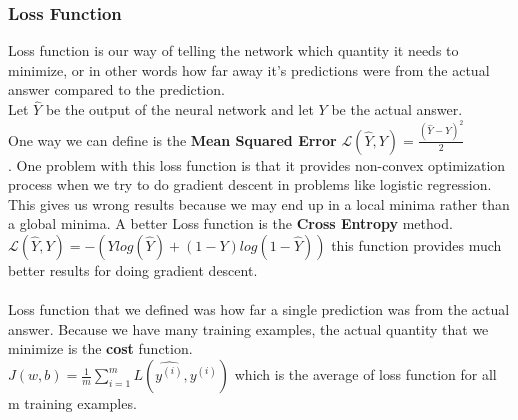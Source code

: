 \documentclass[12pt]{article}
\begin{document}
\subsubsection{Loss Function}
Loss function is our way of telling the network which quantity it needs to minimize, or in other words how far away it's predictions were from the actual answer compared to the prediction. \\ 
Let $\hat{Y}$ be the output of the neural network and let $Y$ be the actual answer. \\ 
One way we can define is the \textbf{Mean Squared Error}
$\mathcal{L}(\hat{Y},Y) = \frac{(\hat{Y}-Y)^{2}}{2}$ \\ . 
One problem with this loss function is that it provides non-convex optimization process when we try to do gradient descent in problems like logistic regression. This gives us wrong results because we may end up in a local minima rather than a global minima. A better Loss function is the
\textbf{Cross Entropy} method. $\mathcal{L}(\hat{Y},Y) = -(Ylog(\hat{Y})+(1-Y)log(1-\hat{Y}))$ this function provides much better results for doing gradient descent. \\ 
\\ 
Loss function that we defined was how far a single prediction was from the actual answer. Because we have many training examples, the actual quantity that we minimize is the \textbf{cost} function. \\ 
$J(w,b) = \frac{1}{m}\sum_{i=1}^{m} L(\hat{y^{(i)}},y^{(i)})$ which is the average of loss function for all m training examples.
\end{document}
